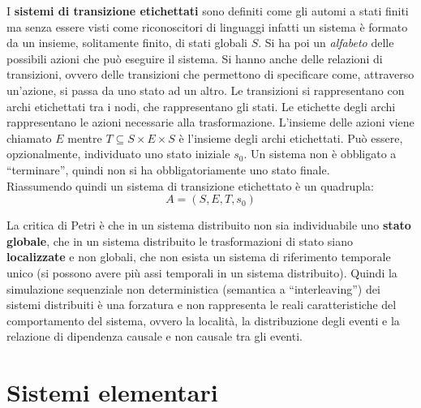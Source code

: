 \documentclass[a4paper,12pt, oneside]{book}
\begin{document}
\begin{definizione}
  I \textbf{sistemi di transizione etichettati} sono definiti come gli automi a
  stati finiti ma senza essere visti come riconoscitori di linguaggi infatti un
  sistema è formato da un insieme, solitamente finito, di stati globali $S$. Si
  ha poi un \textit{alfabeto} delle possibili azioni che può eseguire il
  sistema. Si hanno anche delle relazioni di transizioni, ovvero delle
  transizioni che permettono di specificare come, attraverso un'azione, si passa
  da uno stato ad un altro. Le transizioni si rappresentano con archi
  etichettati tra i nodi, che rappresentano 
  gli stati. Le etichette degli archi rappresentano le azioni necessarie alla
  trasformazione. L'insieme delle azioni viene chiamato $E$ mentre $T\subseteq
  S\times E\times S$ è l'insieme degli archi etichettati. Può essere,
  opzionalmente, individuato uno stato iniziale $s_0$. Un sistema non è
  obbligato a ``terminare'', quindi non si ha obbligatoriamente uno stato
  finale.\\ 
  Riassumendo quindi un sistema di transizione etichettato è un quadrupla:
  \[A=(S,E,T,s_0)\]
\end{definizione}
La critica di Petri è che in un sistema distribuito non sia individuabile uno
\textbf{stato globale}, che in un sistema distribuito le trasformazioni di stato
siano \textbf{localizzate} e non globali, che non esista un sistema di
riferimento temporale unico (si possono avere più assi temporali in un sistema
distribuito). Quindi la simulazione sequenziale non deterministica (semantica a
``interleaving'') dei sistemi distribuiti è una forzatura e non rappresenta le
reali caratteristiche del comportamento del sistema, ovvero la località, la
distribuzione degli eventi e la relazione di dipendenza causale e non causale
tra gli eventi.
\section{Sistemi elementari}
\end{document}
